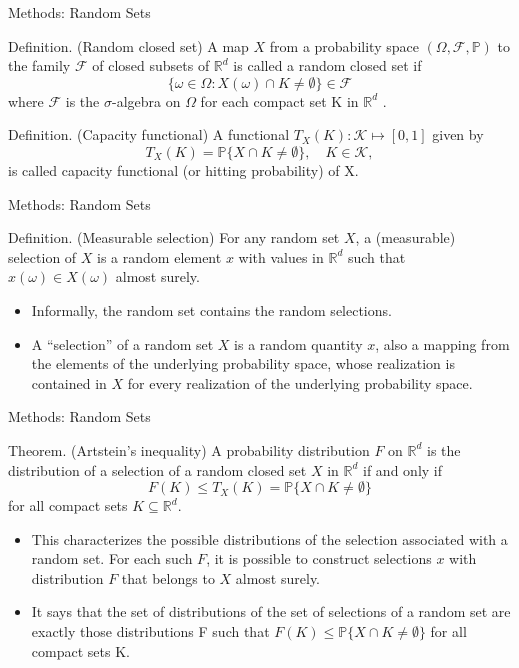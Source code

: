 \documentclass[aspectratio=169]{beamer}  %
\begin{document}
\begin{frame}{Methods: Random Sets}

    \begin{block}{Definition. (Random closed set)}
        A map $X$ from a probability space $(\Omega,\mathscr{F},\mathbb{P})$ to the family $\mathcal{F}$ of closed subsets of $\mathbb{R}^d$ is called a random closed set if
        $$\{\omega\in\Omega:X(\omega)\cap K\neq\emptyset\}\in\mathscr{F}$$
        where $\mathscr{F}$ is the $\sigma$-algebra on $\Omega$ for each compact set K in $\mathbb{R}^d$ .
    \end{block}

    \begin{block}{Definition. (Capacity functional)}
    A functional $T_X(K):\mathcal{K}\mapsto[0,1]$ given by
    $$T_X(K)=\mathbb{P}\{X\cap K\neq\emptyset\},\quad K\in\mathcal{K},$$
    is called capacity functional (or hitting probability) of X.
    \end{block}

\end{frame}

\begin{frame}{Methods: Random Sets}
    \begin{block}{Definition. (Measurable selection)} For any random set $X$, a (measurable) selection of $X$ is a random element $x$ with values in $\mathbb{R}^d$ such that $x(\omega) \in X(\omega)$ almost surely. 
    \end{block}
    \begin{itemize}
        \item Informally, the random set contains the random selections.
        \item A “selection” of a random set $X$ is a random quantity $x$, also a mapping from the elements of the underlying probability space, whose realization is contained in $X$ for every realization of the underlying probability space.
    \end{itemize}
\end{frame}

\begin{frame}{Methods: Random Sets}
    \begin{block}{Theorem. (Artstein's inequality)}
        A probability distribution $F$ on $\mathbb{R}^d$ is the distribution of a selection of a random closed set $X$ in $\mathbb{R}^d$ if and only if $$F(K)\leq T_X(K)=\mathbb{P}\{X\cap K\neq\emptyset\}$$ for all compact sets $K\subseteq\mathbb{R}^d$.
    \end{block}

    \begin{itemize}
        \item This characterizes the possible distributions of the selection associated with a random set. For each such $F$, it is possible to construct selections $x$ with distribution $F$ that belongs to $X$ almost surely.
        \item It says that the set of distributions of the set of selections of a random set are exactly those distributions F such that $F(K)\leq\mathbb{P}\{X\cap K\neq\emptyset\}$ for all compact sets K.
    \end{itemize}
\end{frame}
\end{document}
